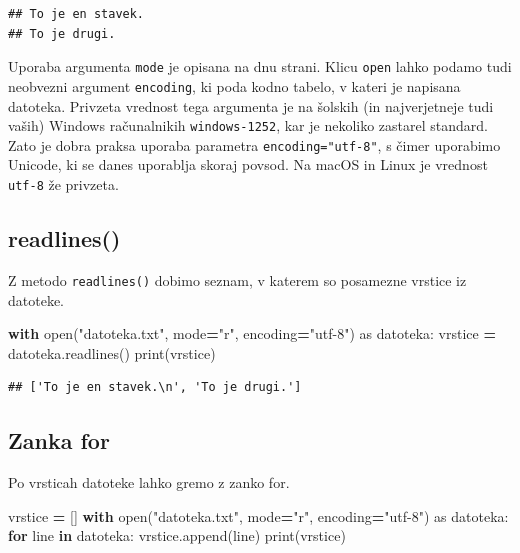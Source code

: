 \documentclass[
]{report}
\newenvironment{Shaded}{\begin{snugshade}}{\end{snugshade}}
\newcommand{\BuiltInTok}[1]{#1}
\newcommand{\ControlFlowTok}[1]{\textcolor[rgb]{0.13,0.29,0.53}{\textbf{#1}}}
\newcommand{\ImportTok}[1]{#1}
\newcommand{\KeywordTok}[1]{\textcolor[rgb]{0.13,0.29,0.53}{\textbf{#1}}}
\newcommand{\NormalTok}[1]{#1}
\newcommand{\OperatorTok}[1]{\textcolor[rgb]{0.81,0.36,0.00}{\textbf{#1}}}
\newcommand{\StringTok}[1]{\textcolor[rgb]{0.31,0.60,0.02}{#1}}
\begin{document}
\begin{verbatim}
## To je en stavek.
## To je drugi.
\end{verbatim}

Uporaba argumenta \texttt{mode} je opisana na dnu strani.
Klicu \texttt{open} lahko podamo tudi neobvezni argument \texttt{encoding}, ki poda kodno
tabelo, v kateri je napisana datoteka. Privzeta vrednost tega argumenta je na
šolskih (in najverjetneje tudi vaših) Windows računalnikih \texttt{windows-1252}, kar je
nekoliko zastarel standard. Zato je dobra praksa uporaba parametra
\texttt{encoding="utf-8"}, s čimer uporabimo Unicode, ki se danes
uporablja skoraj povsod. Na macOS in Linux je vrednost \texttt{utf-8} že privzeta.

\hypertarget{readlines}{%
\subsection{readlines()}\label{readlines}}

Z metodo \texttt{readlines()} dobimo seznam, v katerem so posamezne
vrstice iz datoteke.

\begin{Shaded}
\begin{Highlighting}[]
\ControlFlowTok{with} \BuiltInTok{open}\NormalTok{(}\StringTok{"datoteka.txt"}\NormalTok{, mode}\OperatorTok{=}\StringTok{"r"}\NormalTok{, encoding}\OperatorTok{=}\StringTok{"utf{-}8"}\NormalTok{) }\ImportTok{as}\NormalTok{ datoteka:}
\NormalTok{    vrstice }\OperatorTok{=}\NormalTok{ datoteka.readlines()}
\BuiltInTok{print}\NormalTok{(vrstice)}
\end{Highlighting}
\end{Shaded}

\begin{verbatim}
## ['To je en stavek.\n', 'To je drugi.']
\end{verbatim}

\hypertarget{zanka-for-1}{%
\subsection{Zanka for}\label{zanka-for-1}}

Po vrsticah datoteke lahko gremo z zanko for.

\begin{Shaded}
\begin{Highlighting}[]
\NormalTok{vrstice }\OperatorTok{=}\NormalTok{ []}
\ControlFlowTok{with} \BuiltInTok{open}\NormalTok{(}\StringTok{"datoteka.txt"}\NormalTok{, mode}\OperatorTok{=}\StringTok{"r"}\NormalTok{, encoding}\OperatorTok{=}\StringTok{"utf{-}8"}\NormalTok{) }\ImportTok{as}\NormalTok{ datoteka:}
    \ControlFlowTok{for}\NormalTok{ line }\KeywordTok{in}\NormalTok{ datoteka:}
\NormalTok{        vrstice.append(line)}
\BuiltInTok{print}\NormalTok{(vrstice)}
\end{Highlighting}
\end{Shaded}
\end{document}
